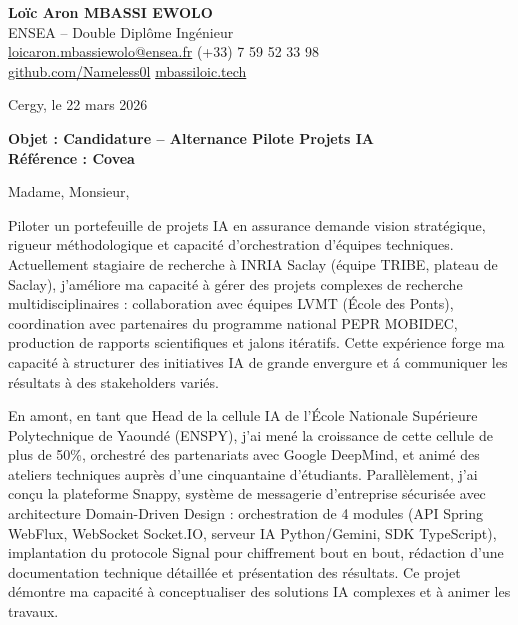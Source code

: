 \documentclass[a4paper,11pt]{article}
\begin{document}
\noindent
\textbf{Lo\"ic Aron MBASSI EWOLO} \\
ENSEA -- Double Dipl\^ome Ing\'enieur \\
\href{mailto:loicaron.mbassiewolo@ensea.fr}{loicaron.mbassiewolo@ensea.fr} \quad (+33) 7 59 52 33 98 \\
\href{https://github.com/Nameless0l}{github.com/Nameless0l} \quad \href{https://mbassiloic.tech}{mbassiloic.tech}

\vspace{1em}
\noindent Cergy, le 22 mars 2026

\vspace{1em}
\noindent
\textbf{Objet : Candidature -- Alternance Pilote Projets IA} \\
\textbf{R\'ef\'erence : Covea}

\vspace{1.5em}
\noindent Madame, Monsieur,

Piloter un portefeuille de projets IA en assurance demande vision strat\'egique, rigueur m\'ethodologique et capacit\'e d'orchestration d'\'equipes techniques. Actuellement stagiaire de recherche \`a INRIA Saclay (\'equipe TRIBE, plateau de Saclay), j'am\'eliore ma capacit\'e \`a g\'erer des projets complexes de recherche multidisciplinaires : collaboration avec \'equipes LVMT (\'Ecole des Ponts), coordination avec partenaires du programme national PEPR MOBIDEC, production de rapports scientifiques et jalons it\'eratifs. Cette exp\'erience forge ma capacit\'e \`a structurer des initiatives IA de grande envergure et \'a communiquer les r\'esultats \`a des stakeholders vari\'es.

\vspace{0.8em}

En amont, en tant que Head de la cellule IA de l'\'Ecole Nationale Sup\'erieure Polytechnique de Yaoundé (ENSPY), j'ai men\'e la croissance de cette cellule de plus de 50\%, orchestr\'e des partenariats avec Google DeepMind, et anim\'e des ateliers techniques aupr\`es d'une cinquantaine d'\'etudiants. Parallèlement, j'ai con\c{c}u la plateforme Snappy, syst\`eme de messagerie d'entreprise s\'ecuris\'ee avec architecture Domain-Driven Design : orchestration de 4 modules (API Spring WebFlux, WebSocket Socket.IO, serveur IA Python/Gemini, SDK TypeScript), implantation du protocole Signal pour chiffrement bout en bout, r\'edaction d'une documentation technique d\'etaill\'ee et pr\'esentation des r\'esultats. Ce projet d\'emontre ma capacit\'e \`a conceptualiser des solutions IA complexes et \`a animer les travaux.
\end{document}
